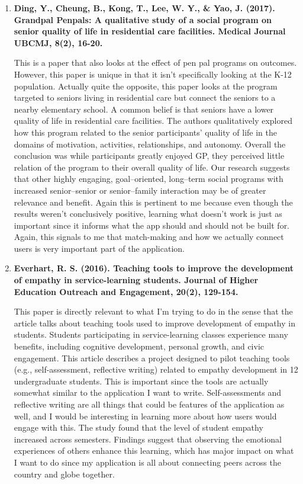 \documentclass[12pt, final]{article}
\begin{document}
\begin{enumerate}
\item \textbf{Ding, Y., Cheung, B., Kong, T., Lee, W. Y., \& Yao, J. (2017). Grandpal Penpals: A qualitative study of a social program on senior quality of life in residential care facilities. Medical Journal UBCMJ, 8(2), 16-20.}

This is a paper that also looks at the effect of pen pal programs on outcomes. However, this paper is unique in that it isn't specifically looking at the K-12 population. Actually quite the opposite, this paper looks at the program targeted to seniors living in residential care but connect the seniors to a nearby elementary school. A common belief is that seniors have a lower quality of life in residential care facilities. The authors qualitatively explored how this program related to the senior participants’ quality of life in the domains of motivation, activities, relationships, and autonomy. Overall the conclusion was while participants greatly enjoyed GP, they perceived little relation of the program to their overall quality of life. Our research suggests that other highly engaging, goal–oriented, long–term social programs with increased senior–senior or senior–family interaction may be of greater relevance and benefit. Again this is pertinent to me because even though the results weren't conclusively positive, learning what doesn't work is just as important since it informs what the app should and should not be built for. Again, this signals to me that match-making and how we actually connect users is very important part of the application. 

\item \textbf{Everhart, R. S. (2016). Teaching tools to improve the development of empathy in service-learning students. Journal of Higher Education Outreach and Engagement, 20(2), 129-154.}

This paper is directly relevant to what I'm trying to do in the sense that the article talks about teaching tools used to improve development of empathy in students. Students participating in service-learning classes experience many benefits, including cognitive development, personal growth, and civic engagement. This article describes a project designed to pilot teaching tools (e.g., self-assessment, reflective writing) related to empathy development in 12 undergraduate students. This is important since the tools are actually somewhat similar to the application I want to write. Self-assessments and reflective writing are all things that could be features of the application as well, and I would be interesting in learning more about how users would engage with this. The study found that the level of student empathy increased across semesters. Findings suggest that observing the emotional experiences of others enhance this learning, which has major impact on what I want to do since my application is all about connecting peers across the country and globe together. 


\end{enumerate}
\end{document}
